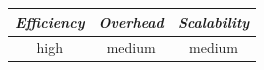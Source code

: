 %
%
%
\begin{center}
{\footnotesize
\begin{tabular}{ccc}
\emph{Efficiency} & \emph{Overhead} & \emph{Scalability} \\
\hline
high &
medium &
medium
\end{tabular}
}
\end{center}

